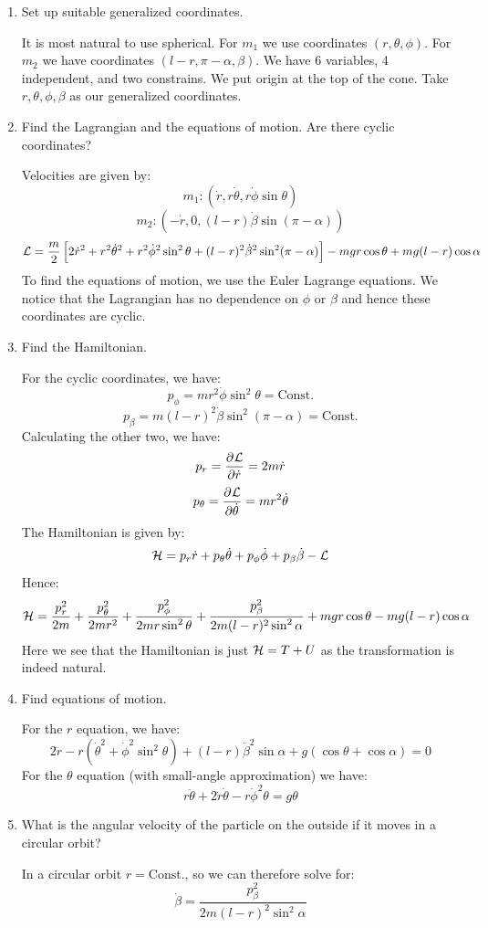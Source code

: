 \begin{enumerate}
    \item Set up suitable generalized coordinates.
    \begin{s}
    It is most natural to use spherical. For $m_1$ we use coordinates $(r, \theta, \phi)$. For $m_2$ we have coordinates $(l - r, \pi - \alpha, \beta)$. We have 6 variables, 4 independent, and two constrains. We put origin at the top of the cone. Take $r, \theta, \phi, \beta$ as our generalized coordinates.
    \end{s}
    \item Find the Lagrangian and the equations of motion. Are there cyclic coordinates?
    \begin{s}
    Velocities are given by:
    \[m_1: (\dot{r}, r\dot{\theta}, r\dot{\phi}\sin\theta)\]
    \[m_2: (-\dot{r}, 0, (l-r)\dot{\beta}\sin(\pi - \alpha))\]
    \[\mathcal{L} = \frac{m}{2}\left[2\dot{r}^2 + r^2\dot{\theta}^2 + r^2\dot{\phi}^2\sin^2\theta + (l-r)^2\dot{\beta}^2\sin^2(\pi - \alpha)\right] - mgr\cos\theta + mg(l-r)\cos\alpha\]
    To find the equations of motion, we use the Euler Lagrange equations. We notice that the Lagrangian has no dependence on $\phi$ or $\beta$ and hence these coordinates are cyclic.
    \end{s}
    \item Find the Hamiltonian.
    \begin{s}
    For the cyclic coordinates, we have:
    \[p_\phi = mr^2\dot{\phi}\sin^2\theta = \text{Const.}\]
    \[p_\beta = m(l-r)^2\dot{\beta}\sin^2(\pi - \alpha) = \text{Const.}\]
    Calculating the other two, we have:
    \[p_r = \dpd{\LL}{\dot{r}} = 2m\dot{r}\]
    \[p_\theta = \dpd{\LL}{\dot{\theta}} = mr^2\dot{\theta}\]
    The Hamiltonian is given by:
    \[\mathcal{H} = p_r\dot{r} + p_\theta\dot{\theta} + p_\phi\dot{\phi} + p_\beta\dot{\beta} - \mathcal{L}\]
    Hence:
    \[\mathcal{H} = \frac{p_r^2}{2m} + \frac{p_\theta^2}{2mr^2} + \frac{p_\phi^2}{2mr\sin^2\theta} + \frac{p_\beta^2}{2m(l-r)^2\sin^2\alpha} + mgr\cos\theta - mg(l-r)\cos\alpha\]
    Here we see that the Hamiltonian is just $\mathcal{H} = T + U$ as the transformation is indeed natural.
    \end{s}
	\item Find equations of motion.
	\begin{s}
	For the $r$ equation, we have:
	\[2\ddot{r} - r(\dot{\theta}^2 + \dot{\phi}^2\sin^2\theta) + (l-r)\dot{\beta}^2\sin\alpha + g(\cos\theta + \cos\alpha) = 0\]
	For the $\theta$ equation (with small-angle approximation) we have:
	\[r\ddot{\theta} + 2\dot{r}\dot{\theta} - r\dot{\phi}^2\theta = g\theta\]
	\end{s}
    \item What is the angular velocity of the particle on the outside if it moves in a circular orbit?
    \begin{s}
    In a circular orbit $r = \text{Const.}$, so we can therefore solve for:
    \[\dot{\beta} = \frac{p_\beta^2}{2m(l-r)^2\sin^2\alpha}\]
    \end{s}
\end{enumerate}